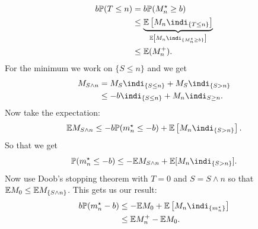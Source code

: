 \documentclass{report}
\begin{document}
\begin{fancyproof}
\begin{align*}
		b\pr(T\leq n)&=b\pr(M^{\star}_{n}\geq b)\\
		&\leq\underbrace{\ev\left[M_{n}\indi_{\{T\leq n\}}\right]}_{\mathclap{\ev\left[M_{n}\indi_{\{M_{n}^{\star}\geq b\}}\right]}}\\
		&\leq\ev(M^{+}_{n}).
	\end{align*}
	For the minimum we work on $\{S\leq n\}$ and we get 
	\begin{align*}
		M_{S\wedge n}&=M_{S}\indi_{\{S\leq n\}}+M_{S}\indi_{\{S>n\}}\\
		&\leq-b\indi_{\{S\leq n\}}+M_{n}\indi_{S\geq n}.
	\end{align*}
	Now take the expectation:
	\begin{equation*}
		\ev M_{S\wedge n}\leq-b\pr(m^{\star}_{n}\leq-b)+\ev\left[M_{n}\indi_{\{S>n\}}\right].
	\end{equation*}
	So that we get
	\begin{equation*}
		\pr(m^{\star}_{n}\leq-b)\leq-\ev M_{S\wedge n}+\ev[M_{n}\indi_{\{S>n\}}].
	\end{equation*}
	Now use Doob's stopping theorem with $T=0$ and $S=S\wedge n$ so that $\mathbb{E} M_{0}\leq\mathbb{E} M_{\{S\wedge n\}}$. This gets us our result:
	\begin{align*}
		b\pr(m^{\star}_{n}-b)&\leq-\ev M_{0}+\ev\left[M_{n}\indi_{\{m_{n}^{\star}\}}\right]\\
		&\leq\ev M^{+}_{n}-\ev M_{0}.
	\end{align*}
\end{fancyproof}
\end{document}
